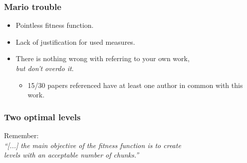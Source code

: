 \documentclass{beamer}
\begin{document}
\begin{frame}
\frametitle{Mario trouble}
\begin{itemize}
\item Pointless fitness function.
\item Lack of justification for used measures.
\item There is nothing wrong with referring to your own work, \\\textit{but don't overdo it}.
\begin{itemize}
\item 15/30 papers referenced have at least one author in common with this work.
\end{itemize}
\end{itemize}
\end{frame}

\begin{frame}
\frametitle{Two optimal levels}

\bigskip

Remember:
\\\textit{``[...] the main objective of the fitness function is to create 
\\levels with an acceptable number of chunks.''} \cite{galvan2010evolving}
\end{frame}
\end{document}

